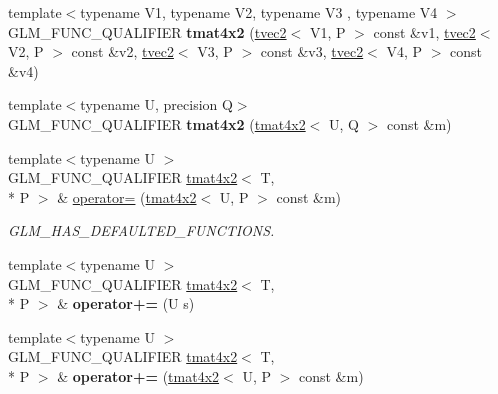 \begin{DoxyCompactItemize}
\item 
\hypertarget{structglm_1_1tmat4x2_a3d41b266dfeb276e13db820296663cea}{{\footnotesize template$<$typename V1, typename V2, typename V3 , typename V4 $>$ }\\G\-L\-M\-\_\-\-F\-U\-N\-C\-\_\-\-Q\-U\-A\-L\-I\-F\-I\-E\-R {\bfseries tmat4x2} (\hyperlink{structglm_1_1tvec2}{tvec2}$<$ V1, P $>$ const \&v1, \hyperlink{structglm_1_1tvec2}{tvec2}$<$ V2, P $>$ const \&v2, \hyperlink{structglm_1_1tvec2}{tvec2}$<$ V3, P $>$ const \&v3, \hyperlink{structglm_1_1tvec2}{tvec2}$<$ V4, P $>$ const \&v4)}\label{structglm_1_1tmat4x2_a3d41b266dfeb276e13db820296663cea}

\item 
\hypertarget{structglm_1_1tmat4x2_a08e86729278cf333bbde38195810311b}{{\footnotesize template$<$typename U, precision Q$>$ }\\G\-L\-M\-\_\-\-F\-U\-N\-C\-\_\-\-Q\-U\-A\-L\-I\-F\-I\-E\-R {\bfseries tmat4x2} (\hyperlink{structglm_1_1tmat4x2}{tmat4x2}$<$ U, Q $>$ const \&m)}\label{structglm_1_1tmat4x2_a08e86729278cf333bbde38195810311b}

\item 
\hypertarget{structglm_1_1tmat4x2_ac513919fdc4d1506721e4e6bf78556a7}{{\footnotesize template$<$typename U $>$ }\\G\-L\-M\-\_\-\-F\-U\-N\-C\-\_\-\-Q\-U\-A\-L\-I\-F\-I\-E\-R \hyperlink{structglm_1_1tmat4x2}{tmat4x2}$<$ T, \\*
P $>$ \& \hyperlink{structglm_1_1tmat4x2_ac513919fdc4d1506721e4e6bf78556a7}{operator=} (\hyperlink{structglm_1_1tmat4x2}{tmat4x2}$<$ U, P $>$ const \&m)}\label{structglm_1_1tmat4x2_ac513919fdc4d1506721e4e6bf78556a7}

\begin{DoxyCompactList}\small\item\em G\-L\-M\-\_\-\-H\-A\-S\-\_\-\-D\-E\-F\-A\-U\-L\-T\-E\-D\-\_\-\-F\-U\-N\-C\-T\-I\-O\-N\-S. \end{DoxyCompactList}\item 
\hypertarget{structglm_1_1tmat4x2_abf01335ab1627fdec0cdeabcc1779d6d}{{\footnotesize template$<$typename U $>$ }\\G\-L\-M\-\_\-\-F\-U\-N\-C\-\_\-\-Q\-U\-A\-L\-I\-F\-I\-E\-R \hyperlink{structglm_1_1tmat4x2}{tmat4x2}$<$ T, \\*
P $>$ \& {\bfseries operator+=} (U s)}\label{structglm_1_1tmat4x2_abf01335ab1627fdec0cdeabcc1779d6d}

\item 
\hypertarget{structglm_1_1tmat4x2_ad0563b333d9ef8633dc748b58352fdee}{{\footnotesize template$<$typename U $>$ }\\G\-L\-M\-\_\-\-F\-U\-N\-C\-\_\-\-Q\-U\-A\-L\-I\-F\-I\-E\-R \hyperlink{structglm_1_1tmat4x2}{tmat4x2}$<$ T, \\*
P $>$ \& {\bfseries operator+=} (\hyperlink{structglm_1_1tmat4x2}{tmat4x2}$<$ U, P $>$ const \&m)}\label{structglm_1_1tmat4x2_ad0563b333d9ef8633dc748b58352fdee}


\end{DoxyCompactItemize}
